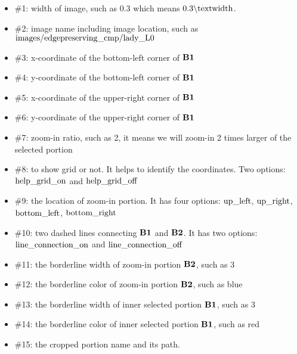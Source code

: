 \documentclass[11pt]{article}
\begin{document}
\begin{itemize}
	\item $\#$1: width of image, such as $0.3$ which means $0.3\backslash\rm{textwidth}$.
	\item $\#$2: image name including image location, such as $\rm{images\slash edgepreserving\_cmp\slash lady\_L0}$
	\item $\#$3: x-coordinate of the bottom-left corner of $\rm\bf{B}1$
	\item $\#$4: y-coordinate of the bottom-left corner of $\rm\bf{B}1$
	\item $\#$5: x-coordinate of the upper-right corner of $\rm\bf{B}1$
	\item $\#$6: y-coordinate of the upper-right corner of $\rm\bf{B}1$
	\item $\#$7: zoom-in ratio, such as 2, it means we will zoom-in 2 times larger of the selected portion
	\item $\#$8: to show grid or not. It helps to identify the coordinates. Two options: $\rm{help}\_grid\_on$ and $\rm{help}\_grid\_off$ 
	\item $\#$9: the location of zoom-in portion. It has four options: $\rm{up\_left}$, $\rm{up\_right}$, $\rm{bottom\_left}$, $\rm{bottom\_right}$
	\item $\#$10: two dashed lines connecting $\rm\bf{B}1$ and $\rm\bf{B}2$. It has two options: $\rm{line\_connection\_on}$ and $\rm{line\_connection\_off}$
	\item $\#$11: the borderline width of zoom-in portion $\rm\bf{B}2$, such as 3
	\item $\#$12: the borderline color of zoom-in portion $\rm\bf{B}2$, such as blue
	\item $\#$13: the borderline width of inner selected portion $\rm\bf{B}1$, such as 3
	\item $\#$14: the borderline color of inner selected portion $\rm\bf{B}1$, such as red
	\item $\#$15: the cropped portion name and its path. 
\end{itemize}
% 
\end{document}
